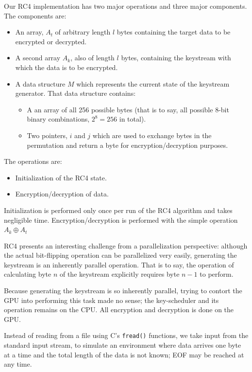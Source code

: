 \documentclass[twocolumn]{article}
\begin{document}
  Our RC4 implementation has two major operations and three major components. The components are:
  
  \begin{itemize}
    \item An array, $A_t$ of arbitrary length $l$  bytes containing the target data to be encrypted or decrypted.
    \item A second array $A_k$, also of length $l$ bytes, containing the keystream with which the data is to be encrypted.
    \item A data structure $M$ which represents the current state of the keystream generator. That data structure contains:
    \begin{itemize}
      \item A an array of all 256 possible bytes (that is to say, all possible 8-bit binary combinations, $2^8=256$ in total).
      \item Two pointers, $i$ and $j$ which are used to exchange bytes in the permutation and return a byte for encryption/decryption purposes.
    \end{itemize}
  \end{itemize}
  
  The operations are:
  
  \begin{itemize}
    \item Initialization of the RC4 state.
    \item Encryption/decryption of data.
  \end{itemize}
  
  Initialization is performed only once per run of the RC4 algorithm and takes negligible time. Encryption/decryption is performed with the simple operation $A_k \oplus A_t$
  
  RC4 presents an interesting challenge from a parallelization perspective: although the actual bit-flipping operation can be parallelized very easily, generating the keystream is an inherently parallel operation. That is to say, the operation of calculating byte $n$ of the keystream explicitly requires byte $n-1$ to perform.
  
  Because generating the keystream is so inherently parallel, trying to contort the GPU into performing this task made no sense; the key-scheduler and its operation remains on the CPU. All encryption and decryption is done on the GPU.
  
  Instead of reading from a file using C's \texttt{fread()} functions, we take input from the standard input stream, to simulate an environment where data arrives one byte at a time and the total length of the data is not known; EOF may be reached at any time.
    
\end{document}
